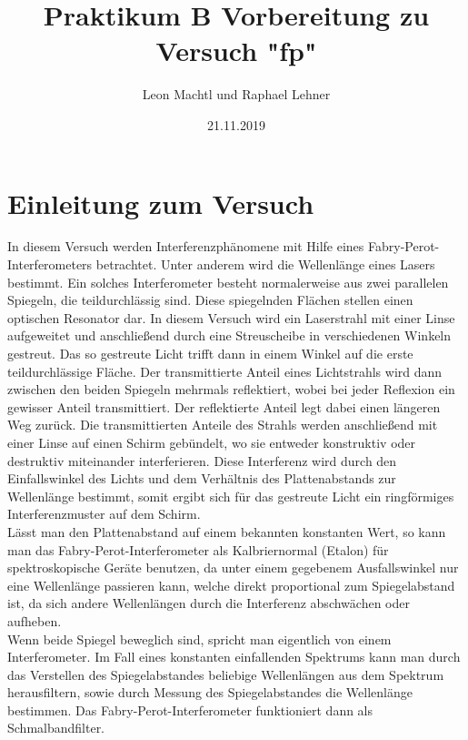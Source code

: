 \documentclass[a4paper,10pt]{scrartcl}
\title{Praktikum B Vorbereitung zu Versuch "fp"}
\author{Leon Machtl und Raphael Lehner}
\date{21.11.2019}
\begin{document}
	\maketitle
	\tableofcontents
	\newpage
	
	\section{Einleitung zum Versuch}
	In diesem Versuch werden Interferenzphänomene mit Hilfe eines Fabry-Perot-Interferometers betrachtet. Unter anderem wird die Wellenlänge eines Lasers bestimmt. Ein solches Interferometer besteht normalerweise aus zwei parallelen Spiegeln, die teildurchlässig sind. Diese spiegelnden Flächen stellen einen optischen Resonator dar. In diesem Versuch wird ein Laserstrahl mit einer Linse aufgeweitet und anschließend durch eine Streuscheibe in verschiedenen Winkeln gestreut. Das so gestreute Licht trifft dann in einem Winkel auf die erste teildurchlässige Fläche. Der transmittierte Anteil eines Lichtstrahls wird dann zwischen den beiden Spiegeln mehrmals reflektiert, wobei bei jeder Reflexion ein gewisser Anteil transmittiert. Der reflektierte Anteil legt dabei einen längeren Weg zurück. Die transmittierten Anteile des Strahls werden anschließend mit einer Linse auf einen Schirm gebündelt, wo sie entweder konstruktiv oder destruktiv miteinander interferieren. Diese Interferenz wird durch den Einfallswinkel des Lichts und dem Verhältnis des Plattenabstands zur Wellenlänge bestimmt, somit ergibt sich für das gestreute Licht ein ringförmiges Interferenzmuster auf dem Schirm. \\
	Lässt man den Plattenabstand auf einem bekannten konstanten Wert, so kann man das Fabry-Perot-Interferometer als Kalbriernormal (Etalon) für spektroskopische Geräte benutzen, da unter einem gegebenem Ausfallswinkel nur eine Wellenlänge passieren kann, welche direkt proportional zum Spiegelabstand ist, da sich andere Wellenlängen durch die Interferenz abschwächen oder aufheben.\\
	Wenn beide Spiegel beweglich sind, spricht man eigentlich von einem Interferometer. Im Fall eines konstanten einfallenden Spektrums kann man durch das Verstellen des Spiegelabstandes beliebige Wellenlängen aus dem Spektrum herausfiltern, sowie durch Messung des Spiegelabstandes die Wellenlänge bestimmen. Das Fabry-Perot-Interferometer funktioniert dann als Schmalbandfilter.
\end{document}

